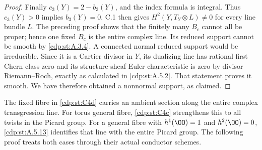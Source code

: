 \begin{proof}
Finally $c_3(Y)=2-b_3(Y)$, and the index formula is integral. Thus $c_3(Y)>0$ implies $b_3(Y)=0$. C.1 then gives $H^2(Y,T_Y\otimes L)\ne0$ for every line bundle $L$. The preceding proof shows that the finitely many $B_c$ cannot all be proper; hence one fixed $B_c$ is the entire complex line. Its reduced support cannot be smooth by \ref{cdp:st:A.3.4}. A connected normal reduced support would be irreducible. Since it is a Cartier divisor in $Y$, its dualizing line has rational first Chern class zero and its structure-sheaf Euler characteristic is zero by divisor Riemann--Roch, exactly as calculated in \ref{cdp:st:A.5.2}. That statement proves it smooth. We have therefore obtained a nonnormal support, as claimed.
\end{proof}

The fixed fibre in \ref{cdp:st:C4d} carries an ambient section along the entire complex transgression line. For torus general fibre, \ref{cdp:st:C4c} strengthens this to all twists in the Picard group. For a general fibre with $h^1(\OO)=1$ and $h^2(\OO)=0$, \ref{cdp:st:A.5.13} identifies that line with the entire Picard group. The following proof treats both cases through their actual conductor schemes.


